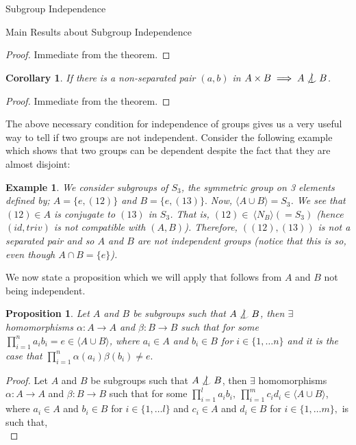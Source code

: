 \documentclass{article}
\newtheorem{proposition}{Proposition}[section]
\newtheorem{corollary}{Corollary}[section]
\newtheorem{example}{Example}[section]
\def\indep{\mathrel{\raise0.2ex\hbox{\ooalign{\hidewidth$\vert$\hidewidth\cr\raise-0.9ex\hbox{$\smile$}}}}}
\begin{document}
\begin{section}{Subgroup Independence}
\begin{subsection}{Main Results about Subgroup Independence}
			\begin{proof}
				Immediate from the theorem. 
			\end{proof}	
			
			\begin{corollary}\label{useful-form}
				If there is a non-separated pair $(a, b)$ in $A \times B \implies A \not \indep B$.
			\end{corollary}
			
			\begin{proof}
				Immediate from the theorem. 
			\end{proof}
			
			
			\noindent The above necessary condition for independence of groups gives us a very useful way to tell if two groups are not independent. Consider the following example which shows that two groups can be dependent despite the fact that they are almost disjoint:
			
			\begin{example} \label{E1}
				\normalfont
				We consider subgroups of $S_3$, the symmetric group on 3 elements defined by; $A = \{e, (12)  \}$ and $B = \{ e,  (13)   \}.$ Now, $\langle A \cup B\rangle  =  S_3$. We see that $(12) \in A$ is conjugate to $ (13) $ in $S_3$. That is, $(12) \in \ \langle N_B \rangle  (= S_3)$ (hence $(id, triv)$ is not compatible with $(A, B)$). Therefore, $((12), (13))$ is not a separated pair and so $A$ and $B$ are not independent groups (notice that this is so, even though $A \cap B = \{e\}$).
			\end{example}
			
			\noindent We now state a  proposition which we will apply that follows from $A$ and $B$  not being independent.
			
			\begin{proposition}\label{notIndep}
				Let $A$ and $B$ be subgroups such that $A \not\indep B$, then $\exists$ homomorphisms $\alpha: A \rightarrow A$ and $\beta: B \rightarrow B$ such that for some $ \prod_{i = 1}^{n} a_ib_i = e \in \langle A \cup B\rangle $, where $a_i \in A$ and $b_i \in B$ for $i \in \{1, \dots n \}$ and it is the case that $ \prod_{i = 1}^{n} \alpha(a_i)\beta(b_i) \not = e.$
			\end{proposition}
			
			\begin{proof}
				Let $A$ and $B$ be subgroups such that $A \not\indep B$, then $\exists$ homomorphisms $\alpha: A \rightarrow A$ and $\beta: B \rightarrow B$ such that for some $\prod_{i = 1}^{l} a_ib_i , \  \prod_{i = 1}^{m} c_id_i  \in \langle A \cup B\rangle $, where $a_i \in A$ and $b_i \in B$ for $i \in \{1, \dots l \}$ and $c_i \in A$ and $d_i \in B$ for $i \in \{1, \dots m \},$ is such that, \\
				

\end{proof}
\end{subsection}
\end{section}
\end{document}

